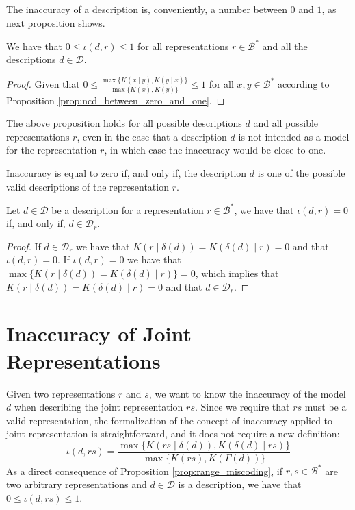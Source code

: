 The inaccuracy of a description is, conveniently, a number between $0$ and $1$, as next proposition shows.

\begin{proposition}
\label{prop:inaccuracy:inaccuracy:range}
We have that $0 \leq \iota(d, r) \leq 1$ for all representations $r \in \mathcal{B}^\ast$ and all the descriptions $d \in \mathcal{D}$.
\end{proposition}
\begin{proof}
Given that $0 \leq \frac{ \max\{ K(x \mid y), K(y \mid x) \} } { \max\{ K(x), K(y) \} } \leq 1$ for all $x, y \in \mathcal{B}^\ast$ according to Proposition \ref{prop:ncd_between_zero_and_one}.
\end{proof}

The above proposition holds for all possible descriptions $d$ and all possible representations $r$, even in the case that a description $d$ is not intended as a model for the representation $r$, in which case the inaccuracy would be close to one.

Inaccuracy is equal to zero if, and only if, the description $d$ is one of the possible valid descriptions of the representation $r$.

\begin{proposition}\label{prop:perfect_description}
Let $d \in \mathcal{D}$ be a description for a representation $r \in \mathcal{B}^\ast$, we have that $\iota(d, r) = 0$ if, and only if, $d \in \mathcal{D}_r$.
\end{proposition}
\begin{proof}
If $d \in \mathcal{D}_r$ we have that $K \left( r \mid \delta(d) \right) = K \left( \delta(d) \mid r \right) = 0$ and that $\iota(d, r) = 0$. If $\iota(d, r) = 0$ we have that $\max\{ K \left( r \mid \delta(d) \right) = K \left( \delta(d) \mid r \right) \} = 0$, which implies that $K \left( r \mid \delta(d) \right) = K \left( \delta(d) \mid r \right) = 0$ and that $d \in \mathcal{D}_r$.
\end{proof}

%
%

\section{Inaccuracy of Joint Representations}

Given two representations $r$ and $s$, we want to know the inaccuracy of the model $d$ when describing the joint representation $rs$. Since we require that $rs$ must be a valid representation, the formalization of the concept of inaccuracy applied to joint representation is straightforward, and it does not require a new definition:
\[
\iota(d, rs) = \frac{ \max\{ K \left(rs \mid \delta(d) \right), K \left( \delta(d) \mid rs \right) \} } { \max\{ K(rs), K \left(\Gamma(d) \right) \} }
\]
As a direct consequence of Proposition \ref{prop:range_miscoding}, if $r, s \in \mathcal{B}^\ast$ are two arbitrary representations and $d \in \mathcal{D}$ is a description, we have that $0 \leq \iota(d, rs) \leq 1$.

